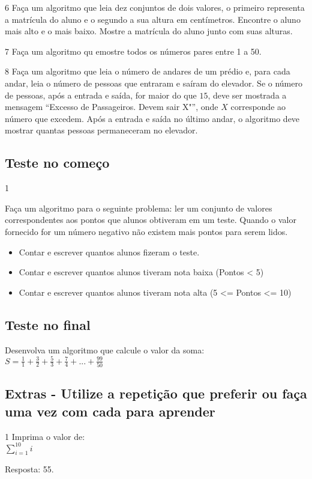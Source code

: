 \begin{exercicio}
  {6}
  {Faça um algoritmo que leia dez conjuntos de dois valores, o primeiro representa a matrícula do aluno e o segundo a sua altura em centímetros. Encontre o aluno mais alto e o mais baixo. Mostre a matrícula do aluno junto com suas alturas.}
\end{exercicio}
\begin{exercicio}
  {7}
  {Faça um algoritmo qu emostre todos os números pares entre 1 a 50.}
\end{exercicio}
\begin{exercicio}
  {8}
  {Faça um algoritmo que leia o número de andares de um prédio e, para cada andar, leia o número de pessoas que entraram e saíram do elevador. Se o número de pessoas, após a entrada e saída, for maior do que $15$, deve ser mostrada a mensagem ``Excesso de Passageiros. Devem sair X"'', onde $X$ corresponde ao número que excedem. Após a entrada e saída no último andar, o algoritmo deve mostrar quantas pessoas permaneceram no elevador.}
\end{exercicio}
\subsection{Teste no começo}
\begin{exercicio}
  {1}
  {Faça um algoritmo para o seguinte problema: ler um conjunto de valores correspondentes aos pontos que alunos obtiveram em um teste. Quando o valor fornecido for um número negativo não existem mais pontos para serem lidos.
  \begin{itemize}
    \item Contar e escrever quantos alunos fizeram o teste.
    \item Contar e escrever quantos alunos tiveram nota baixa (Pontos < 5)
    \item Contar e escrever quantos alunos tiveram nota alta (5 <= Pontos <= 10)
  \end{itemize}}
\end{exercicio}
\subsection{Teste no final}
\begin{exercicio}
  Desenvolva um algoritmo que calcule o valor da soma: \\
  $S = \frac{1}{1} + \frac{3}{2} + \frac{5}{3} + \frac{7}{4} + ... + \frac{99}{50}$
\end{exercicio}
\subsection{Extras - Utilize a repetição que preferir ou faça uma vez com cada para aprender}
\begin{exercicio}
  {1}
  {Imprima o valor de: \\
  $\sum\limits_{i=1}^{10} i$}
  
  Resposta: 55.
\end{exercicio}

